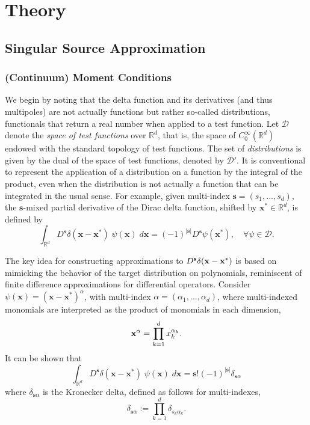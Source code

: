\newpage

\section{Theory}

\subsection{Singular Source Approximation}



\subsubsection{(Continuum) Moment Conditions}

%
We begin by noting that the delta function and its derivatives (and thus multipoles) are not actually functions but rather so-called distributions, functionals that return a real number when applied to a test function. 
Let $\mathcal D$ denote the {\em space of test functions} over $\mathbb R^d$, that is, the space of $C^\infty_0(\mathbb R^d)$ endowed with the standard topology of test functions.
The set of \emph{distributions} is given by the dual of the space of test functions, denoted by $\mathcal D'$.
It is conventional to represent the application of a distribution on a function by the integral of the product, even when the distribution is not actually a function that can be integrated in the usual sense.
For example, given multi-index $\mathbf s=(s_1,...,s_d)$, the $\mathbf s$-mixed partial derivative of the Dirac delta function, shifted by $\mathbf x^*\in\mathbb R^d$, is defined by
\[
	\int_{\mathbb R^d} D^{\mathbf s} \delta(\mathbf x-\mathbf x^*) \; \psi(\mathbf x)\; d\mathbf x =
	(-1)^{|\mathbf s|} D^{\mathbf s} \psi(\mathbf x^*), \quad \forall \psi \in\mathcal D.
\]

%
The key idea for constructing approximations to $D^{\bf s}\delta(\mathbf x-\mathbf x^*)$ is based on mimicking the behavior of the target distribution on polynomials, reminiscent of finite difference approximations for differential operators.
Consider $\psi(\mathbf x) = (\mathbf x - \mathbf x^*)^{\alpha}$, with multi-index $\alpha=(\alpha_1,...,\alpha_d)$, where multi-indexed monomials are interpreted as the product of monomials in each dimension,
\[
       {\bf x}^{\alpha} = \prod_{k=1}^d x_k^{\alpha_k}.
\] 
It can be shown that
\[
	\int_{\mathbb R^d} D^{\mathbf s}\delta(\mathbf x-\mathbf x^*)\; \psi(\mathbf x) \; d\mathbf x = \mathbf s! (-1)^{|\mathbf s|} \delta_{\mathbf s \alpha}
\]
where $\delta_{\mathbf s \alpha}$ is the Kronecker delta, defined as follows for multi-indexes,
\[
	\delta_{\mathbf s \alpha} := \prod_{k=1}^d \delta_{s_k \alpha_k}.
\]


